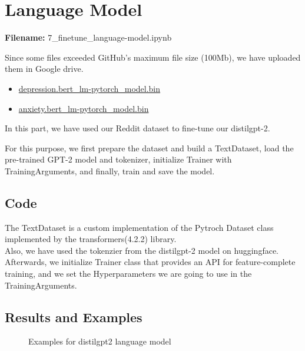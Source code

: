\documentclass[12pt, a4paper]{article}
\begin{document}
\section*{Language Model}
\large{\textbf{Filename:} 7\_finetune\_language-model.ipynb}

Since some files exceeded GitHub's maximum file size (100Mb), we have uploaded them in Google drive. 
\begin{itemize}
	\item \href{https://drive.google.com/file/d/1AmbAl9mFoGG9mITTTz7TRgPEwVUAiN9U/view?usp=sharing}{depression.bert\_lm-pytorch\_model.bin}
	\item
	\href{https://drive.google.com/file/d/19-KhVSsBFo7WpfzeXNKDpUnYKv5xfDkY/view?usp=sharing}{anxiety.bert\_lm-pytorch\_model.bin}
\end{itemize}

\vspace{5mm}
In this part, we have used our Reddit dataset to fine-tune our distilgpt-2.

For this purpose, we first prepare the dataset and build a TextDataset, load the pre-trained GPT-2 model and tokenizer, initialize Trainer with TrainingArguments, and finally, train and save the model. 

\subsection*{Code}
The TextDataset is a custom implementation of the Pytroch Dataset class implemented by the transformers(4.2.2) library.
\\Also, we have used the tokenzier from the distilgpt-2 model on huggingface.
\\Afterwards, we initialize Trainer class that provides an API for feature-complete training, and we set the Hyperparameters we are going to use in the TrainingArguments.

\subsection*{Results and Examples}
\begin{figure}[H]
	\caption{Examples for distilgpt2 language model}
	\label{finetune-lm_examples.png}
\end{figure}
%
\end{document}
